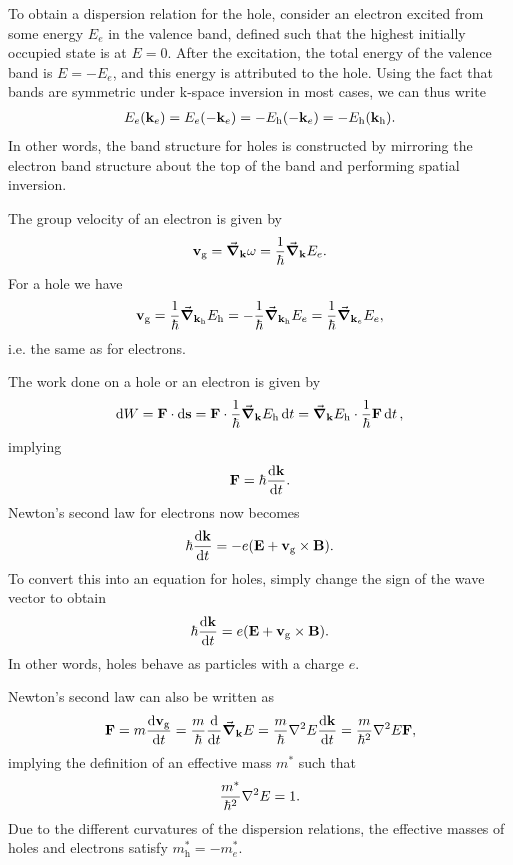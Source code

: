 To obtain a dispersion relation for the hole, consider an electron excited from some energy $E_{e}$ in the valence band, defined such that the highest initially occupied state is at $E = 0$. After the excitation, the total energy of the valence band is $E = -E_{e}$, and this energy is attributed to the hole. Using the fact that bands are symmetric under k-space inversion in most cases, we can thus write
\begin{align*}
	E_{e}(\vb{k}_{e}) = E_{e}(-\vb{k}_{e}) = -E_{\text{h}}(-\vb{k}_{e}) = -E_{\text{h}}(\vb{k}_{\text{h}}).
\end{align*}
In other words, the band structure for holes is constructed by mirroring the electron band structure about the top of the band and performing spatial inversion.

The group velocity of an electron is given by
\begin{align*}
	\vb{v}_{\text{g}} = \grad_{\vb{k}}{\omega} = \frac{1}{\hbar}\grad_{\vb{k}}{E_{e}}.
\end{align*}
For a hole we have
\begin{align*}
	\vb{v}_{\text{g}} = \frac{1}{\hbar}\grad_{\vb{k}_{\text{h}}}{E_{\text{h}}} = -\frac{1}{\hbar}\grad_{\vb{k}_{\text{h}}}{E_{e}} = \frac{1}{\hbar}\grad_{\vb{k}_{e}}{E_{e}},
\end{align*}
i.e. the same as for electrons.

The work done on a hole or an electron is given by
\begin{align*}
	\dd{W} = \vb{F}\cdot\dd{\vb{s}} = \vb{F}\cdot\frac{1}{\hbar}\grad_{\vb{k}}{E_{\text{h}}}\dd{t} = \grad_{\vb{k}}{E_{\text{h}}}\cdot\frac{1}{\hbar}\vb{F}\dd{t},
\end{align*}
implying
\begin{align*}
	\vb{F} = \hbar\dv{\vb{k}}{t}.
\end{align*}
Newton's second law for electrons now becomes
\begin{align*}
	\hbar\dv{\vb{k}}{t} = -e(\vb{E} + \vb{v}_{\text{g}}\times\vb{B}).
\end{align*}
To convert this into an equation for holes, simply change the sign of the wave vector to obtain
\begin{align*}
	\hbar\dv{\vb{k}}{t} = e(\vb{E} + \vb{v}_{\text{g}}\times\vb{B}).
\end{align*}
In other words, holes behave as particles with a charge $e$.

Newton's second law can also be written as
\begin{align*}
	\vb{F} = m\dv{\vb{v}_{\text{g}}}{t} = \frac{m}{\hbar}\dv{t}\grad_{\vb{k}}{E} = \frac{m}{\hbar}\laplacian{E}\dv{\vb{k}}{t} = \frac{m}{\hbar^{2}}\laplacian{E}\vb{F},
\end{align*}
implying the definition of an effective mass $m^{*}$ such that
\begin{align*}
	\frac{m^{*}}{\hbar^{2}}\laplacian{E} = 1.
\end{align*}
Due to the different curvatures of the dispersion relations, the effective masses of holes and electrons satisfy $m^{*}_{\text{h}} = -m^{*}_{e}$.


